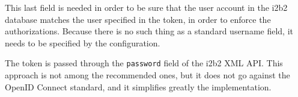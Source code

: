 This last field is needed in order to be sure that the user account in the i2b2 database matches the user specified in the token, in order to enforce the authorizations.
Because there is no such thing as a standard username field, it needs to be specified by the configuration.

The token is passed through the \verb|password| field of the i2b2 XML API.
This approach is not among the recommended ones, but it does not go against the OpenID Connect standard, and it simplifies greatly the implementation.

